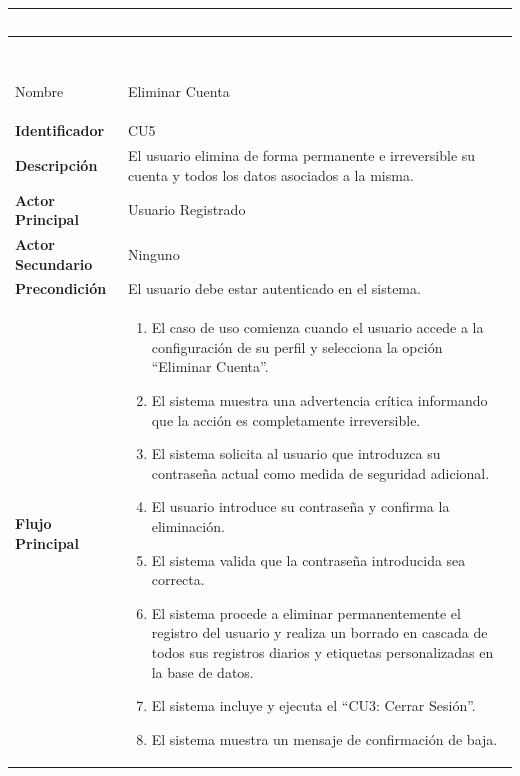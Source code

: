 \begingroup
\small 
\renewcommand{\arraystretch}{1.4}
\begin{xltabular}{\textwidth}{|>{\bfseries}p{3.5cm}|X|}
    \textcolor{white}{Campo} & \textcolor{white}{Descripción} \\ \hline
    \endfirsthead

     \\
    \hline
    \textcolor{white}{Campo} & \textcolor{white}{Descripción} \\ \hline
    \endhead


    Nombre & Eliminar Cuenta \\ \hline
    Identificador & CU5 \\ \hline
    Descripción & El usuario elimina de forma permanente e irreversible su cuenta y todos los datos asociados a la misma. \\ \hline
    Actor Principal & Usuario Registrado \\ \hline
    Actor Secundario & Ninguno \\ \hline
    Precondición & El usuario debe estar autenticado en el sistema. \\ \hline
    Flujo Principal & 
    \begin{enumerate}[leftmargin=0.5cm, topsep=0pt, partopsep=0pt, parsep=0pt, itemsep=4pt]
        \item El caso de uso comienza cuando el usuario accede a la configuración de su perfil y selecciona la opción ``Eliminar Cuenta''.
        \item El sistema muestra una advertencia crítica informando que la acción es completamente irreversible.
        \item El sistema solicita al usuario que introduzca su contraseña actual como medida de seguridad adicional.
        \item El usuario introduce su contraseña y confirma la eliminación.
        \item El sistema valida que la contraseña introducida sea correcta.
        \item El sistema procede a eliminar permanentemente el registro del usuario y realiza un borrado en cascada de todos sus registros diarios y etiquetas personalizadas en la base de datos.
        \item El sistema incluye y ejecuta el ``CU3: Cerrar Sesión''.
        \item El sistema muestra un mensaje de confirmación de baja.

\end{enumerate}
\end{xltabular}
